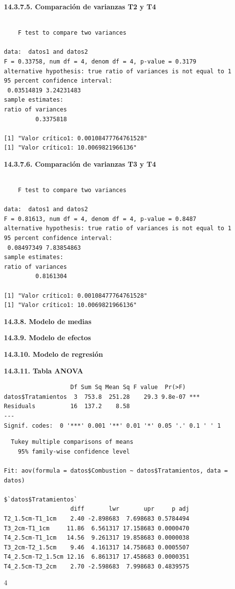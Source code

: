 \documentclass[
  letterpaper,
  DIV=11,
  numbers=noendperiod]{scrartcl}
\begin{document}
\textbf{14.3.7.5. Comparación de varianzas T2 y T4}

\begin{verbatim}

    F test to compare two variances

data:  datos1 and datos2
F = 0.33758, num df = 4, denom df = 4, p-value = 0.3179
alternative hypothesis: true ratio of variances is not equal to 1
95 percent confidence interval:
 0.03514819 3.24231483
sample estimates:
ratio of variances 
         0.3375818 

[1] "Valor crítico1: 0.00108477764761528"
[1] "Valor crítico1: 10.0069821966136"
\end{verbatim}

\textbf{14.3.7.6. Comparación de varianzas T3 y T4}

\begin{verbatim}

    F test to compare two variances

data:  datos1 and datos2
F = 0.81613, num df = 4, denom df = 4, p-value = 0.8487
alternative hypothesis: true ratio of variances is not equal to 1
95 percent confidence interval:
 0.08497349 7.83854863
sample estimates:
ratio of variances 
         0.8161304 

[1] "Valor crítico1: 0.00108477764761528"
[1] "Valor crítico1: 10.0069821966136"
\end{verbatim}

\textbf{14.3.8. Modelo de medias}

\textbf{14.3.9. Modelo de efectos}

\textbf{14.3.10. Modelo de regresión}

\textbf{14.3.11. Tabla ANOVA}

\begin{verbatim}
                   Df Sum Sq Mean Sq F value  Pr(>F)    
datos$Tratamientos  3  753.8  251.28    29.3 9.8e-07 ***
Residuals          16  137.2    8.58                    
---
Signif. codes:  0 '***' 0.001 '**' 0.01 '*' 0.05 '.' 0.1 ' ' 1
\end{verbatim}

\begin{verbatim}
  Tukey multiple comparisons of means
    95% family-wise confidence level

Fit: aov(formula = datos$Combustion ~ datos$Tratamientos, data = datos)

$`datos$Tratamientos`
                   diff       lwr       upr     p adj
T2_1.5cm-T1_1cm    2.40 -2.898683  7.698683 0.5784494
T3_2cm-T1_1cm     11.86  6.561317 17.158683 0.0000470
T4_2.5cm-T1_1cm   14.56  9.261317 19.858683 0.0000038
T3_2cm-T2_1.5cm    9.46  4.161317 14.758683 0.0005507
T4_2.5cm-T2_1.5cm 12.16  6.861317 17.458683 0.0000351
T4_2.5cm-T3_2cm    2.70 -2.598683  7.998683 0.4839575
\end{verbatim}

4
\end{document}
